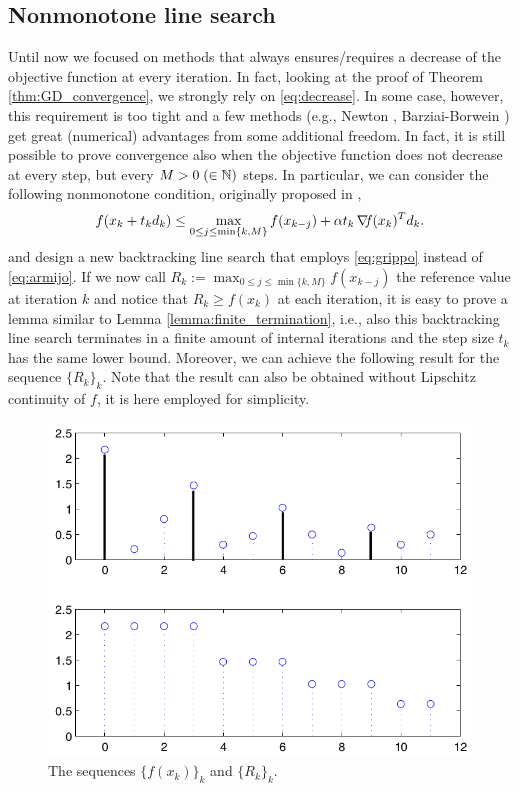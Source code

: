 \documentclass[10pt,a4paper]{article}
\begin{document}
\subsection{Nonmonotone line search}
Until now we focused on methods that always ensures/requires a decrease of the objective function at every iteration. In fact, looking at the proof of Theorem \ref{thm:GD_convergence}, we strongly rely on \eqref{eq:decrease}. In some case, however, this requirement is too tight and a few methods (e.g., Newton \cite{grippo86a}, Barziai-Borwein \cite{raydan97a}) get great (numerical) advantages from some additional freedom. In fact, it is still possible to prove convergence also when the objective function does not decrease at every step, but every $M>0 \;(\in\mathbb{N})$ steps. In particular, we can consider the following nonmonotone condition, originally proposed in \cite{grippo86a}, 
\begin{equation}\label{eq:grippo}
	f(x_k +t_k d_k) \leq \max_{0\leq j \leq \min\{k,M\}} f(x_{k-j}) + \alpha t_k\operatorname*{\mathit{\nabla \!f}}(x_k)^Td_k.
\end{equation}
and design a new backtracking line search that employs \eqref{eq:grippo} instead of \eqref{eq:armijo}. 
If we now call $R_k:= \displaystyle\max_{0\leq j \leq \min\{k,M\}} f(x_{k-j})$ the reference value at iteration $k$ and notice that $R_k\geq f(x_k)$ at each iteration, it is easy to prove a lemma similar to Lemma \ref{lemma:finite_termination}, i.e., also this backtracking line search terminates in a finite amount of internal iterations and the step size $t_k$ has the same lower bound. Moreover, we can achieve the following result for the sequence $\{R_k\}_k$. Note that the result can also be obtained without Lipschitz continuity of $f$, it is here employed for simplicity.
\begin{figure}
	\centering
	\includegraphics[width=0.5\linewidth]{nonmonotone}
	\caption{The sequences $\{f(x_k)\}_k$ and $\{R_k\}_k$.}
\end{figure}
\end{document}
